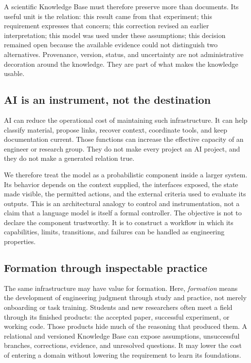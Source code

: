 \documentclass[10pt,a4paper]{article}
\begin{document}
A scientific Knowledge Base must therefore preserve more than documents. Its useful unit is the relation: this result came from that experiment; this requirement expresses that concern; this correction revised an earlier interpretation; this model was used under these assumptions; this decision remained open because the available evidence could not distinguish two alternatives. Provenance, version, status, and uncertainty are not administrative decoration around the knowledge. They are part of what makes the knowledge usable.

\subsection{AI is an instrument, not the destination}

AI can reduce the operational cost of maintaining such infrastructure. It can help classify material, propose links, recover context, coordinate tools, and keep documentation current. Those functions can increase the effective capacity of an engineer or research group. They do not make every project an AI project, and they do not make a generated relation true.

We therefore treat the model as a probabilistic component inside a larger system. Its behavior depends on the context supplied, the interfaces exposed, the state made visible, the permitted actions, and the external criteria used to evaluate its outputs. This is an architectural analogy to control and instrumentation, not a claim that a language model is itself a formal controller. The objective is not to declare the component trustworthy. It is to construct a workflow in which its capabilities, limits, transitions, and failures can be handled as engineering properties.

\subsection{Formation through inspectable practice}

The same infrastructure may have value for formation. Here, \emph{formation} means the development of engineering judgment through study and practice, not merely onboarding or task training. Students and new researchers often meet a field through its finished products: the accepted paper, successful experiment, or working code. Those products hide much of the reasoning that produced them. A relational and versioned Knowledge Base can expose assumptions, unsuccessful branches, corrections, evidence, and unresolved questions. It may lower the cost of entering a domain without lowering the requirement to learn its foundations.
\end{document}
